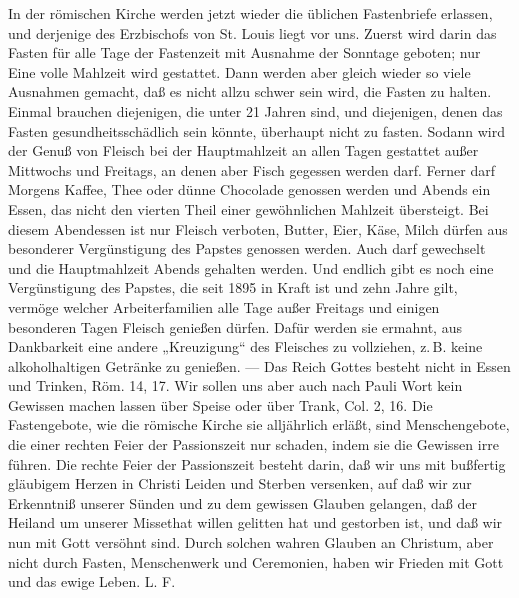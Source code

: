 In der römischen Kirche werden jetzt wieder die üblichen Fastenbriefe erlassen, und derjenige des Erzbischofs von St. Louis liegt vor uns. Zuerst wird darin das Fasten für alle Tage der Fastenzeit mit Ausnahme der Sonntage geboten; nur Eine volle Mahlzeit wird gestattet. Dann werden aber gleich wieder so viele Ausnahmen gemacht, daß es nicht allzu schwer sein wird, die Fasten zu halten. Einmal brauchen diejenigen, die unter 21 Jahren sind, und diejenigen, denen das Fasten gesundheitsschädlich sein könnte, überhaupt nicht zu fasten. Sodann wird der Genuß von Fleisch bei der Hauptmahlzeit an allen Tagen gestattet außer Mittwochs und Freitags, an denen aber Fisch gegessen werden darf. Ferner darf Morgens Kaffee, Thee oder dünne Chocolade genossen werden und Abends ein Essen, das nicht den vierten Theil einer gewöhnlichen Mahlzeit übersteigt. Bei diesem Abendessen ist nur Fleisch verboten, Butter, Eier, Käse, Milch dürfen aus besonderer Vergünstigung des Papstes genossen werden. Auch darf gewechselt und die Hauptmahlzeit Abends gehalten werden. Und endlich gibt es noch eine Vergünstigung des Papstes, die seit 1895 in Kraft ist und zehn Jahre gilt, vermöge welcher Arbeiterfamilien alle Tage außer Freitags und einigen besonderen Tagen Fleisch genießen dürfen. Dafür werden sie ermahnt, aus Dankbarkeit eine andere „Kreuzigung“ des Fleisches zu vollziehen, z.\,B. keine alkoholhaltigen Getränke zu genießen. — Das Reich Gottes besteht nicht in Essen und Trinken, Röm. 14, 17. Wir sollen uns aber auch nach Pauli Wort kein Gewissen machen lassen über Speise oder über Trank, Col. 2, 16. Die Fastengebote, wie die römische Kirche sie alljährlich erläßt, sind Menschengebote, die einer rechten Feier der Passionszeit nur schaden, indem sie die Gewissen irre führen. Die rechte Feier der Passionszeit besteht darin, daß wir uns mit bußfertig gläubigem Herzen in Christi Leiden und Sterben versenken, auf daß wir zur Erkenntniß unserer Sünden und zu dem gewissen Glauben gelangen, daß der Heiland um unserer Missethat willen gelitten hat und gestorben ist, und daß wir nun mit Gott versöhnt sind. Durch solchen wahren Glauben an Christum, aber nicht durch Fasten, Menschenwerk und Ceremonien, haben wir Frieden mit Gott und das ewige Leben. L. F.
